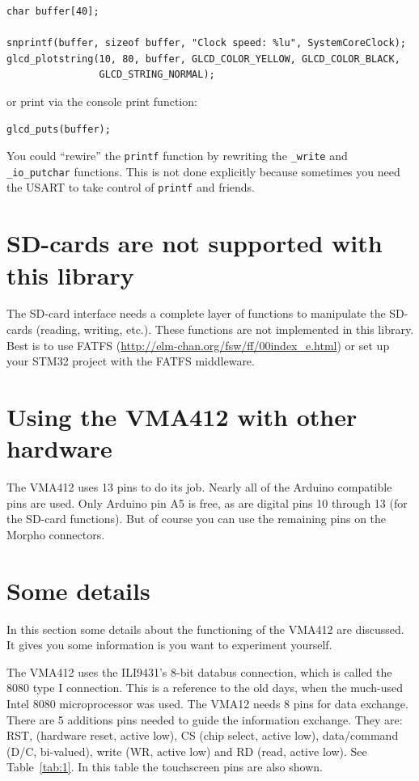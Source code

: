 \documentclass[12pt]{article}
\begin{document}
\begin{lstlisting}
char buffer[40];

snprintf(buffer, sizeof buffer, "Clock speed: %lu", SystemCoreClock);
glcd_plotstring(10, 80, buffer, GLCD_COLOR_YELLOW, GLCD_COLOR_BLACK,
                GLCD_STRING_NORMAL);
\end{lstlisting}

or print via the console print function:

\begin{lstlisting}
glcd_puts(buffer);
\end{lstlisting}

You could ``rewire'' the \lstinline|printf| function by rewriting the \lstinline|_write| and \lstinline|_io_putchar| functions. This is not done explicitly because sometimes you need the USART to take control of \lstinline|printf| and friends.


\section{SD-cards are not supported with this library}
The SD-card interface needs a complete layer of functions to manipulate the SD-cards (reading, writing, etc.). These functions are not implemented in this library. Best is to use FATFS (\url{http://elm-chan.org/fsw/ff/00index_e.html}) or set up your STM32 project with the FATFS middleware.


\section{Using the VMA412 with other hardware}
The VMA412 uses 13 pins to do its job. Nearly all of the Arduino compatible pins are used. Only Arduino pin A5 is free, as are digital pins 10 through 13 (for the SD-card functions). But of course you can use the remaining pins on the Morpho connectors.


\section{Some details}
In this section some details about the functioning of the VMA412 are discussed. It gives you some information is you want to experiment yourself.

The VMA412 uses the ILI9431's 8-bit databus connection, which is called the 8080 type I connection. This is a reference to the old days, when the much-used Intel 8080 microprocessor was used. The VMA12 needs 8 pins for data exchange. There are 5 additions pins needed to guide the information exchange. They are: RST, (hardware reset, active low), CS (chip select, active low), data/command (D/C, bi-valued), write (WR, active low) and RD (read, active low). See Table~\ref{tab:1}. In this table the touchscreen pins are also shown.
\end{document}
